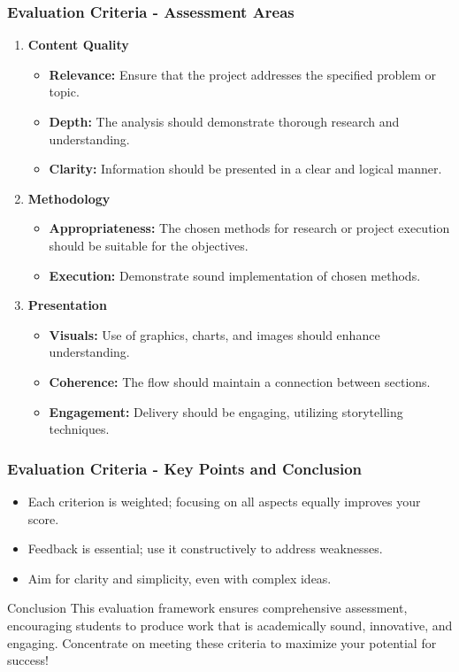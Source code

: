 \documentclass[aspectratio=169]{beamer}
\begin{document}
\begin{frame}[fragile]
  \frametitle{Evaluation Criteria - Assessment Areas}
  \begin{enumerate}
    \item \textbf{Content Quality}
      \begin{itemize}
        \item \textbf{Relevance:} Ensure that the project addresses the specified problem or topic.
        \item \textbf{Depth:} The analysis should demonstrate thorough research and understanding.
        \item \textbf{Clarity:} Information should be presented in a clear and logical manner.
      \end{itemize}
    
    \item \textbf{Methodology}
      \begin{itemize}
        \item \textbf{Appropriateness:} The chosen methods for research or project execution should be suitable for the objectives.
        \item \textbf{Execution:} Demonstrate sound implementation of chosen methods.
      \end{itemize}
    
    \item \textbf{Presentation}
      \begin{itemize}
        \item \textbf{Visuals:} Use of graphics, charts, and images should enhance understanding.
        \item \textbf{Coherence:} The flow should maintain a connection between sections.
        \item \textbf{Engagement:} Delivery should be engaging, utilizing storytelling techniques.
      \end{itemize}
  \end{enumerate}
\end{frame}

\begin{frame}[fragile]
  \frametitle{Evaluation Criteria - Key Points and Conclusion}
  \begin{itemize}
    \item Each criterion is weighted; focusing on all aspects equally improves your score.
    \item Feedback is essential; use it constructively to address weaknesses.
    \item Aim for clarity and simplicity, even with complex ideas.
  \end{itemize}

  \begin{block}{Conclusion}
    This evaluation framework ensures comprehensive assessment, encouraging students to produce work that is academically sound, innovative, and engaging. Concentrate on meeting these criteria to maximize your potential for success!
  \end{block}
\end{frame}
\end{document}
